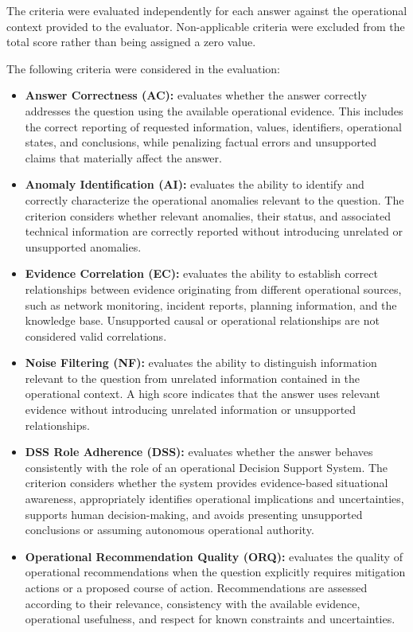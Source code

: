The criteria were evaluated independently for each answer against the operational context provided to the evaluator. Non-applicable criteria were excluded from the total score rather than being assigned a zero value.

The following criteria were considered in the evaluation:

\begin{itemize}
    \item \textbf{Answer Correctness (AC):} evaluates whether the answer correctly addresses the question using the available operational evidence. This includes the correct reporting of requested information, values, identifiers, operational states, and conclusions, while penalizing factual errors and unsupported claims that materially affect the answer.

    \item \textbf{Anomaly Identification (AI):} evaluates the ability to identify and correctly characterize the operational anomalies relevant to the question. The criterion considers whether relevant anomalies, their status, and associated technical information are correctly reported without introducing unrelated or unsupported anomalies.

    \item \textbf{Evidence Correlation (EC):} evaluates the ability to establish correct relationships between evidence originating from different operational sources, such as network monitoring, incident reports, planning information, and the knowledge base. Unsupported causal or operational relationships are not considered valid correlations.

    \item \textbf{Noise Filtering (NF):} evaluates the ability to distinguish information relevant to the question from unrelated information contained in the operational context. A high score indicates that the answer uses relevant evidence without introducing unrelated information or unsupported relationships.

    \item \textbf{DSS Role Adherence (DSS):} evaluates whether the answer behaves consistently with the role of an operational Decision Support System. The criterion considers whether the system provides evidence-based situational awareness, appropriately identifies operational implications and uncertainties, supports human decision-making, and avoids presenting unsupported conclusions or assuming autonomous operational authority.

    \item \textbf{Operational Recommendation Quality (ORQ):} evaluates the quality of operational recommendations when the question explicitly requires mitigation actions or a proposed course of action. Recommendations are assessed according to their relevance, consistency with the available evidence, operational usefulness, and respect for known constraints and uncertainties.
\end{itemize}

